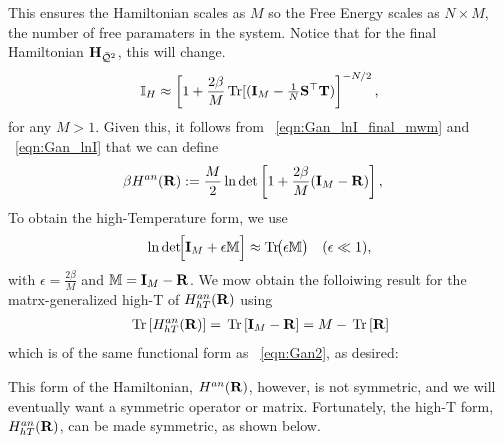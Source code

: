 This ensures the Hamiltonian scales as $M$ so the Free Energy scales as $N \times M$, the
number of free paramaters in the system.
Notice that for the final \LayerQualitySquared Hamiltonian $\mathbf{H}_{\bar{\mathcal{Q}}^{2}}$, this will change.
\begin{align}
  \label{eqn:I_9}
    \mathbb{I}_{H}\approx  \left[1  + \frac{2\beta}{M}\operatorname{Tr}[(\mathbf{I}_{M}-\tfrac{1}{N}{\mathbf{S}}^{\top}{\mathbf{T}})\right]^{-N/2} ,
\end{align}
for any $M>1$.
Given this, it follows from \EQN~\ref{eqn:Gan_lnI_final_mwm} and \EQN~\ref{eqn:Gan_lnI} that we can define 
\begin{align}
\label{eqn:GANmat}
\beta H^{an}(\mathbf{R}) 
  &:=  \frac{M}{2}\ln\det \left[1 + \frac{2\beta}{M}(\mathbf{I}_{M}-\mathbf{R})\right]  ,
\end{align}
To obtain the high-Temperature form, we use
\begin{align}
\ln\det\!\Bigl[\mathbf{I}_{M} + \epsilon\mathbb{M}\Bigr]
\approx \mathrm{Tr}\!\bigl(\epsilon\mathbb{M}\bigr)
\quad(\epsilon\ll 1),
\end{align}
with $\epsilon=\tfrac{2\beta}{M}$ and $\mathbb{M}=\mathbf{I}_{M}-\mathbf{R}$.   
We mow obtain the folloiwing result for the matrx-generalized high-T of $H^{an}_{hT}(\mathbf{R})$ using
\begin{align}
\label{eqn:GANHTmatR}
\mbox{}\operatorname{Tr}\left[H^{an}_{hT}(\mathbf{R})\right] = \mbox{}\operatorname{Tr}\left[\mathbf{I}_{M}-\mathbf{R}\right] = M-\mbox{}\operatorname{Tr}\left[\mathbf{R}\right]
\end{align}
which is of the same functional form as \EQN~\ref{eqn:Gan2}, as desired:




This form of the Hamiltonian, $H^{an}(\mathbf{R})$, however, is not symmetric, and we will
eventually want a symmetric operator or matrix.
Fortunately, the high-T form, $H^{an}_{hT}(\mathbf{R})$, can be made symmetric, as
shown below.
